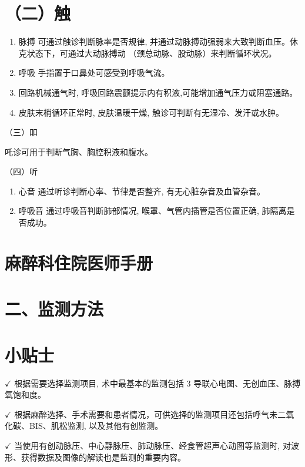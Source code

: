 \documentclass[10pt]{article}
\begin{document}
\section*{（二）触}
\begin{enumerate}
  \item 脉搏 可通过触诊判断脉率是否规律, 并通过动脉搏动强弱来大致判断血压。休克状态下，可通过大动脉搏动 （颈总动脉、股动脉）来判断循环状况。

  \item 呼吸 手指置于口鼻处可感受到呼吸气流。

  \item 回路机械通气时, 呼吸回路震颤提示内有积液,可能增加通气压力或阻塞通路。

  \item 皮肤末梢循环正常时, 皮肤温暖干燥, 触诊可判断有无湿冷、发汗或水肿。

\end{enumerate}

（三）吅

吒诊可用于判断气胸、胸腔积液和腹水。

（四）听

\begin{enumerate}
  \item 心音 通过听诊判断心率、节律是否整齐, 有无心脏杂音及血管杂音。

  \item 呼吸音 通过呼吸音判断肺部情况, 喉罩、气管内插管是否位置正确, 肺隔离是否成功。

\end{enumerate}

\section*{麻醉科住院医师手册}
\section*{二、监测方法}
\section*{小贴士}
$\checkmark$ 根据需要选择监测项目, 术中最基本的监测包括 3 导联心电图、无创血压、脉搏氧饱和度。

$\checkmark$ 根据麻醉选择、手术需要和患者情况，可供选择的监测项目还包括呼气未二氧化碳、BIS、肌松监测, 以及其他有创监测。

$\checkmark$ 当使用有创动脉压、中心静脉压、肺动脉压、经食管超声心动图等监测时, 对波形、获得数据及图像的解读也是监测的重要内容。
\end{document}
